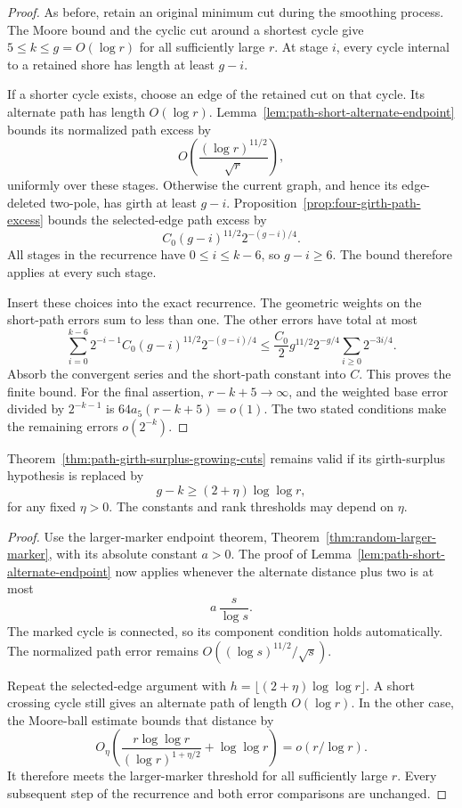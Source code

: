 \begin{proof}
As before, retain an original minimum cut during the smoothing process.
The Moore bound and the cyclic cut around a shortest cycle give
$5\le k\le g=O(\log r)$ for all sufficiently large $r$.
At stage $i$, every cycle internal to a retained shore has length at least $g-i$.

If a shorter cycle exists, choose an edge of the retained cut on that cycle.
Its alternate path has length $O(\log r)$.
Lemma~\ref{lem:path-short-alternate-endpoint} bounds its normalized path excess by
\[
 O\!\left(\frac{(\log r)^{11/2}}{\sqrt r}\right),
\]
uniformly over these stages.
Otherwise the current graph, and hence its edge-deleted two-pole, has girth at least $g-i$.
Proposition~\ref{prop:four-girth-path-excess} bounds the selected-edge path excess by
\[
 C_0(g-i)^{11/2}2^{-(g-i)/4}.
\]
All stages in the recurrence have $0\le i\le k-6$, so $g-i\ge6$.
The bound therefore applies at every such stage.

Insert these choices into the exact recurrence.
The geometric weights on the short-path errors sum to less than one.
The other errors have total at most
\[
 \sum_{i=0}^{k-6}2^{-i-1}C_0(g-i)^{11/2}2^{-(g-i)/4}
 \le\frac{C_0}{2}g^{11/2}2^{-g/4}
       \sum_{i\ge0}2^{-3i/4}.
\]
Absorb the convergent series and the short-path constant into $C$.
This proves the finite bound.
For the final assertion, $r-k+5\to\infty$, and the weighted base error divided by $2^{-k-1}$ is $64a_5(r-k+5)=o(1)$.
The two stated conditions make the remaining errors $o(2^{-k})$.
\end{proof}

\begin{corollary}
\label{cor:path-two-log-girth-surplus}
Theorem~\ref{thm:path-girth-surplus-growing-cuts} remains valid if its girth-surplus hypothesis is replaced by
\[
 g-k\ge(2+\eta)\log\log r,
\]
for any fixed $\eta>0$.
The constants and rank thresholds may depend on $\eta$.
\end{corollary}

\begin{proof}
Use the larger-marker endpoint theorem, Theorem~\ref{thm:random-larger-marker}, with its absolute constant $a>0$.
The proof of Lemma~\ref{lem:path-short-alternate-endpoint} now applies whenever the alternate distance plus two is at most
\[
 a\,\frac{s}{\log s}.
\]
The marked cycle is connected, so its component condition holds automatically.
The normalized path error remains $O((\log s)^{11/2}/\sqrt s)$.

Repeat the selected-edge argument with
$h=\lfloor(2+\eta)\log\log r\rfloor$.
A short crossing cycle still gives an alternate path of length $O(\log r)$.
In the other case, the Moore-ball estimate bounds that distance by
\[
 O_\eta\!\left(
 \frac{r\log\log r}{(\log r)^{1+\eta/2}}
 +\log\log r\right)
 =o(r/\log r).
\]
It therefore meets the larger-marker threshold for all sufficiently large $r$.
Every subsequent step of the recurrence and both error comparisons are unchanged.
\end{proof}
